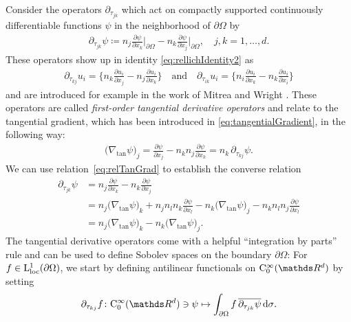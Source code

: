 Consider the operators $\partial_{\tau_{jk}}$ which act on compactly supported continuously differentiable functions $\psi$ in the neighborhood of $\partial\Omega$ by
\begin{align}
  \label{eq:defnTangDerivative}
  \partial_{\tau_{jk}} \psi \coloneqq n_j \frac{\partial \psi}{\partial x_k} \bigg|_{\partial\Omega} - n_k \frac{\partial \psi}{\partial x_j} \bigg|_{\partial\Omega}, \quad j,k = 1,\dots,d.
\end{align}
These operators show up in identity \eqref{eq:rellichIdentity2} as
\begin{align*}
  \partial_{\tau_{kj}} u_i = \Big\{ n_k \frac{\partial u_i}{\partial x_j} - n_j \frac{\partial u_i}{\partial x_k} \Big\}
  \quad\text{and}\quad
  \partial_{\tau_{ik}} u_i =  \Big\{ n_i \frac{\partial u_i}{\partial x_k} - n_k \frac{\partial u_i}{\partial x_i} \Big\}
\end{align*}
and are introduced for example in the work of Mitrea and Wright \cite[p.\@~16]{mitreaWright}. 
These operators are called \emph{first-order tangential derivative operators} and relate to the tangential gradient, which has been introduced in 
\eqref{eq:tangentialGradient}, in the following way:
\begin{align}
  \label{eq:relTanGrad}
  \big(\nabla_{\mathrm{tan}} \psi\big)_j = \frac{\partial \psi}{\partial x_j} - n_k n_j \frac{\partial \psi}{\partial x_k} = n_k \, \partial_{\tau_{kj}} \psi.
\end{align}
We can use relation~\eqref{eq:relTanGrad} to establish the converse relation
\begin{align}
  \label{eq:relGradTan}
  \partial_{\tau_{jk}} \psi
  &= n_j \frac{\partial \psi}{\partial x_k} - n_k \frac{\partial\psi}{\partial x_j} \nonumber\\
  &= n_j \big(\nabla_{\mathrm{tan}} \psi \big)_k + n_j n_l n_k \frac{\partial\psi}{\partial x_l} - n_k \big( \nabla_{\mathrm{tan}} \psi \big)_j - n_k n_l n_j \frac{\partial \psi}{\partial x_l} \nonumber\\
  &= n_j \big( \nabla_{\mathrm{tan}} \psi \big)_k - n_k \big( \nabla_{\mathrm{tan}} \psi \big)_j.
\end{align}
The tangential derivative operators come with a helpful  ``integration by parts'' rule and can be used to define Sobolev spaces on the boundary $\partial\Omega$:
For $f \in \mathrm{L}^1_{\mathrm{loc}}(\partial\Omega)$, we start by defining antilinear functionals on $\CC_0^\infty(\R^d)$ by setting
\begin{align*}
    \partial_{\tau_{kj}} f \colon \CC_0^\infty(\R^d) \ni \psi \mapsto \int_{\partial\Omega} f \, \overline{ \partial_{\tau_{jk}} \psi} \d\sigma.
\end{align*}
